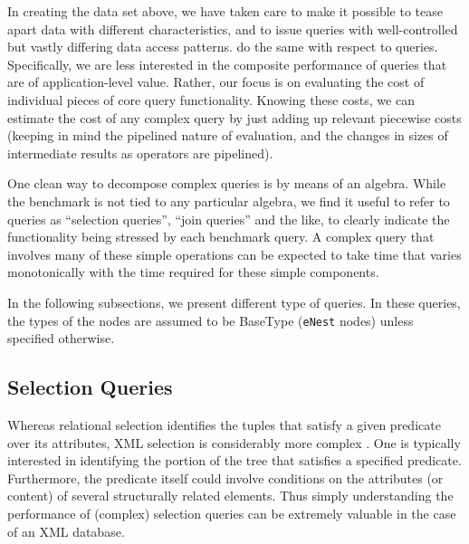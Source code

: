 In creating the data set above, we have taken care to make it possible
to tease apart data with different characteristics, and to issue
queries with well-controlled but vastly differing data access
patterns.    do the same with respect to
queries.  Specifically, we are less interested in the composite
performance of queries that are of application-level value.  Rather,
our focus is on evaluating the cost of individual pieces of core query
functionality.  Knowing these costs, we can estimate the cost of any
complex query by just adding up relevant piecewise costs (keeping in
mind the pipelined nature of evaluation, and the changes in sizes of
intermediate results as operators are pipelined).

One clean way to decompose complex queries is by means of an algebra.
While the benchmark is not tied to any particular algebra, we find it
useful to refer to queries as ``selection queries'', ``join queries''
and the like, to clearly indicate the functionality being stressed by
each benchmark query.  A complex query that involves many of these
simple operations can be expected to take time that varies
monotonically with the time required for these simple components.

In the following subsections, we present different type of queries.  
In these queries, the types of the nodes are assumed to be {\sf BaseType} 
(\verb=eNest= nodes) unless specified otherwise.


\subsection{Selection Queries}
Whereas relational selection identifies the tuples that satisfy a
given predicate over its attributes, XML selection is considerably
more complex \new{}.  One is typically interested in
identifying the portion of the tree that satisfies a specified
predicate.  Furthermore, the predicate itself could involve conditions
on the attributes (or content) of several structurally related
elements. Thus simply understanding the performance of (complex)
selection queries can be extremely valuable in the case of an XML
database.

